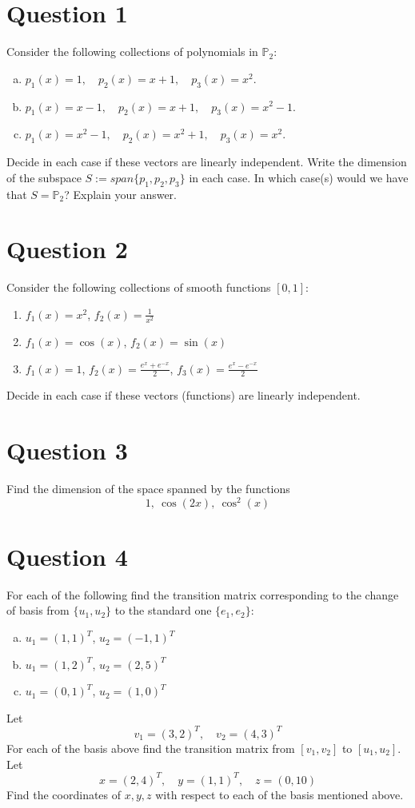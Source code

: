 \documentclass{article}
\begin{document}
\section*{Question 1}
Consider the following collections of polynomials in $\mathbb{P}_2$:
\begin{enumerate}[(a)]
    \item $p_1(x) = 1, \quad p_2(x) = x + 1, \quad p_3(x) = x^2$.
    \item $p_1(x) = x - 1, \quad p_2(x) = x + 1, \quad p_3(x) = x^2 - 1$.
    \item $p_1(x) = x^2 - 1, \quad p_2(x) = x^2 + 1, \quad p_3(x) = x^2$.
\end{enumerate}
Decide in each case if these vectors are linearly independent.
Write the dimension of the subspace $S := span\{p_1, p_2, p_3\}$ in each case.
In which case(s) would we have that $S = \mathbb{P}_2$? Explain your answer.

\section*{Question 2}
Consider the following collections of smooth functions $[0,1]$:
\begin{enumerate}
    \item $f_1(x) = x^2$, $f_2(x) = \frac{1}{x^2}$
    \item $f_1(x) = \cos(x)$, $f_2(x) = \sin(x)$
    \item $f_1(x) = 1$, $f_2(x) = \frac{e^x + e^{-x}}{2}$, $f_3(x) = \frac{e^x - e^{-x}}{2}$
\end{enumerate}
Decide in each case if these vectors (functions) are linearly independent.

\section*{Question 3}
Find the dimension of the space spanned by the functions
$$1, \medspace \cos(2x), \medspace \cos^2(x)$$

\section*{Question 4}
For each of the following find the transition matrix corresponding to the change of basis from $\{u_1, u_2\}$ to the standard one $\{e_1, e_2\}$:
\begin{enumerate}[(a)]
    \item $u_1 = (1,1)^T$, $u_2 = (-1,1)^T$
    \item $u_1 = (1,2)^T$, $u_2 = (2,5)^T$
    \item $u_1 = (0,1)^T$, $u_2 = (1,0)^T$
\end{enumerate}
Let
$$ v_1 = (3,2)^T, \quad v_2 = (4,3)^T $$
For each of the basis above find the transition matrix from $[v_1, v_2]$ to $[u_1, u_2]$.
\newline
Let
$$ x = (2,4)^T, \quad y = (1,1)^T, \quad z = (0,10) $$
Find the coordinates of $x, y, z$ with respect to each of the basis mentioned above.
\end{document}
